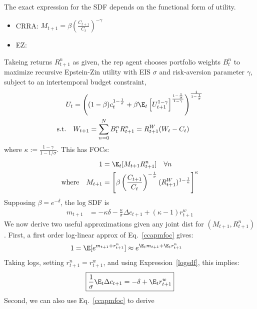 \documentclass[12pt]{article}
\theoremstyle{plain}
\theoremstyle{definition}
\theoremstyle{remark}
\begin{document}
\begin{multicols*}{2}
\begin{enumerate}
    The exact expression for the SDF depends on the functional form of
    utility.
    \begin{itemize}
      \item CRRA:
        $M_{t+1}=\beta\left(\frac{C_{t+1}}{C_t}\right)^{-\gamma}$
      \item EZ:
    \end{itemize}
\end{enumerate}
Takeing returns $R^n_{t+1}$ as given,
the rep agent chooses portfolio weights $B_t^n$ to maximize recursive
Epstein-Zin utility with EIS $\sigma$ and risk-aversion parameter
$\gamma$, subject to an intertemporal budget constraint,
\begin{align*}
  U_t
  &=
  \left(
  (1-\beta)c_t^{1-\frac{1}{\sigma}}
  + \beta
  \E_t\left[U_{t+1}^{1-\gamma}\right]^{\frac{1-\frac{1}{\sigma}}{1-\gamma}}
  \right)^{\frac{1}{1-\frac{1}{\sigma}}}
  \\
  \text{s.t.}\quad&
  W_{t+1}
  =
  \sum_{n=0}^N B_t^n R_{t+1}^n
  =
  R^W_{t+1}(W_t-C_t)
\end{align*}
where $\kappa := \frac{1-\gamma}{1-1/\sigma}$.
This has FOCs:
\begin{align}
  1 &= \E_t[M_{t+1}R_{t+1}^n]
  \quad \forall n
  \label{ccapmfoc}
  \\
  \text{where}\quad
  M_{t+1}
  &=
  \left[
  \beta \left(
  \frac{C_{t+1}}{C_t}
  \right)^{-\frac{1}{\sigma}}
  (R^W_{t+1})^{1-\frac{1}{\kappa}}
  \right]^\kappa
  \notag
\end{align}
Supposing $\beta=e^{-\delta}$, the log SDF is
\begin{align}
  m_{t+1}
  &=
  -\kappa
  \delta
  -
  \frac{\kappa}{\sigma}
  \Delta c_{t+1}
  +
  \left(
  \kappa-1
  \right)
  r^w_{t+1}
  \label{logsdf}
\end{align}
We now derive two useful approximations given any joint dist for
$(M_{t+1},R_{t+1}^n)$.
First, a first order log-linear approx of Eq.~\ref{ccapmfoc} gives:
\begin{align}
  1
  &=
  \E[e^{m_{t+1}+r_{t+1}^n}]
  \approx e^{\E_tm_{t+1}+\E_tr^n_{t+1}}
  \notag
\end{align}
Taking logs, setting $r_{t+1}^n=r_{t+1}^w$, and using
Expression~\ref{logsdf}, this implies:
\begin{align}
  \boxed{
  \frac{1}{\sigma}\E_t\Delta c_{t+1}
  =
  - \delta + \E_tr_{t+1}^w
  }
  \label{ezeuler}
\end{align}
Second, we can also use Eq.~\ref{ccapmfoc} to derive

\end{multicols*}
\end{document}
